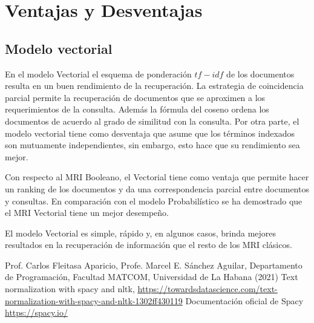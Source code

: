 \documentclass[runningheads,a4paper]{llncs}
\begin{document}


\section{Ventajas y Desventajas}\label{sec:ventajas-y-desventajas}

\subsection{Modelo vectorial}\label{subsec:modelo-vectorial}
En el modelo Vectorial el esquema de ponderaci\'on $tf-idf$ de los documentos resulta en un buen rendimiento de la recuperaci\'on.
La estrategia de coincidencia parcial permite la recuperaci\'on de documentos que se aproximen a los requerimientos de la consulta.
Adem\'as la f\'ormula del coseno ordena los documentos de acuerdo al grado de similitud con la consulta.
Por otra parte, el modelo vectorial tiene como desventaja que asume que los t\'erminos indexados son mutuamente independientes, sin embargo, esto hace que su rendimiento sea mejor.

Con respecto al MRI Booleano, el Vectorial tiene como ventaja que permite hacer un ranking de los documentos y da una correspondencia parcial entre documentos y consultas.
En comparaci\'on con el modelo Probabil\'istico se ha demostrado que el MRI Vectorial tiene un mejor desempeño.

El modelo Vectorial es simple, r\'apido y, en algunos casos, brinda mejores resultados en la recuperaci\'on de informaci\'on que el resto de los MRI cl\'asicos.



\begin{thebibliography}{4}

 Prof.
Carlos Fleitasa Aparicio, Profe.
Marcel E. S\'anchez Aguilar, Departamento de Programaci\'on, Facultad MATCOM, Universidad de La Habana (2021)
 Text normalization with spacy and nltk, \url{https://towardsdatascience.com/text-normalization-with-spacy-and-nltk-1302ff430119}
 Documentaci\'on oficial de Spacy \url{https://spacy.io/}

\end{thebibliography}
\end{document}
